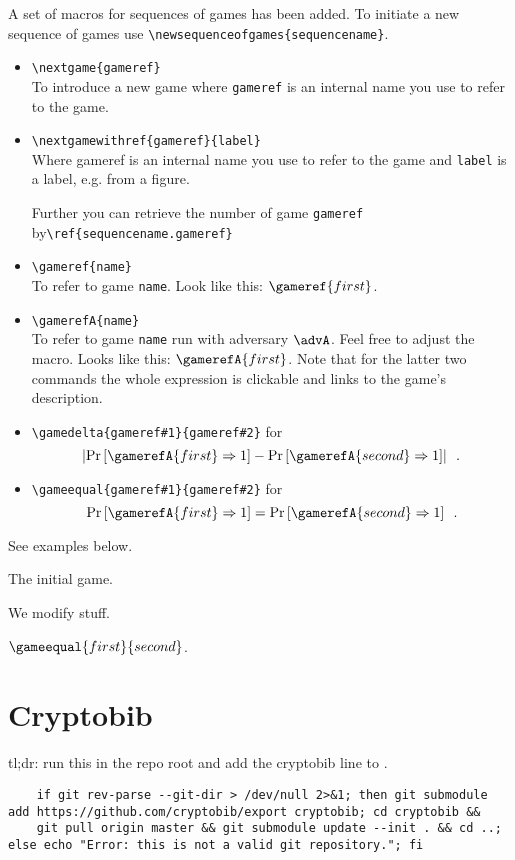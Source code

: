 A set of macros for sequences of games has been added. To initiate a new sequence of games use \verb|\newsequenceofgames{sequencename}|.
\begin{itemize}
\item \verb|\nextgame{gameref}|\\
To introduce a new game where \verb|gameref| is an internal name you use to refer to the game.
\item \verb|\nextgamewithref{gameref}{label}|\\
Where gameref is an internal name you use to refer to the game and \verb|label| is a label, e.g. from a figure.

Further you can retrieve the number of game \verb|gameref| by\linebreak\verb|\ref{sequencename.gameref}|
\item \verb|\gameref{name}|\\
To refer to game \verb|name|. Look like this: $\gameref{first}$.
\item \verb|\gamerefA{name}|\\
To refer to game \verb|name| run with adversary $\advA$. Feel free to adjust the macro. Looks like this:
$\gamerefA{first}$. Note that for the latter two commands the whole expression is clickable and links to the game's description.
\item \verb|\gamedelta{gameref#1}{gameref#2}| for
\[
\left|\Pr\left[\gamerefA{first}\Rightarrow 1\right]-\Pr\left[\gamerefA{second}\Rightarrow 1\right]\right|\enspace.
\]
\item \verb|\gameequal{gameref#1}{gameref#2}| for
\[
\Pr\left[\gamerefA{first}\Rightarrow 1\right]=\Pr\left[\gamerefA{second}\Rightarrow 1\right]\enspace.
\]
\end{itemize}
See examples below.

 The initial game.

 We modify stuff.

\begin{claim}
$\gameequal{first}{second}$.
\end{claim}

\section{Cryptobib}
tl;dr: run this in the repo root and add the cryptobib line to \verb||.
\begin{tiny}
\begin{verbatim}
	if git rev-parse --git-dir > /dev/null 2>&1; then git submodule add https://github.com/cryptobib/export cryptobib; cd cryptobib &&
	git pull origin master && git submodule update --init . && cd ..; else echo "Error: this is not a valid git repository."; fi
\end{verbatim}
\end{tiny}

